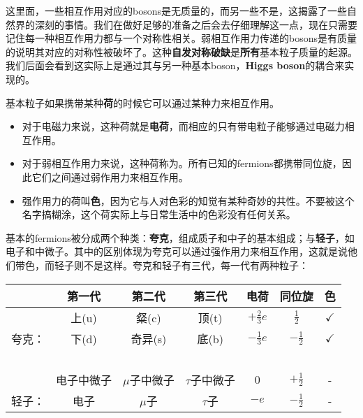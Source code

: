这里面，一些相互作用对应的bosons是无质量的，而另一些不是，这揭露了一些自然界的深刻的事情。我们在做好足够的准备之后会去仔细理解这一点，现在只需要记住每一种相互作用力都与一个对称性相关。弱相互作用力传递的bosons是有质量的说明其对应的对称性被破坏了。这种{\bf 自发对称破缺}是{\bf 所有}基本粒子质量的起源。我们后面会看到这实际上是通过其与另一种基本boson，{\bf Higgs boson}的耦合来实现的。

基本粒子如果携带某种{\bf 荷}的时候它可以通过某种力来相互作用。

\begin{itemize}
\item 对于电磁力来说，这种荷就是{\bf 电荷}，而相应的只有带电粒子能够通过电磁力相互作用。
\item 对于弱相互作用力来说，这种荷称为。所有已知的fermions都携带同位旋，因此它们之间通过弱作用力来相互作用。
\item 强作用力的荷叫{\bf 色}，因为它与人对色彩的知觉有某种奇妙的共性。不要被这个名字搞糊涂，这个荷实际上与日常生活中的色彩没有任何关系。
\end{itemize}

基本的fermions被分成两个种类：{\bf 夸克}，组成质子和中子的基本组成；与{\bf 轻子}，如电子和中微子。其中的区别体现为夸克可以通过强作用力来相互作用，这就是说他们带色，而轻子则不是这样。夸克和轻子有三代，每一代有两种粒子：

\begin{table}[h]
\centering
\begin{tabular}{c|c|c|c|c|c|c}
 \hline
 & 第一代 & 第二代 & 第三代 & 电荷 & 同位旋 & 色 \\
 \hline
 & 上(u)  & 粲(c) &  顶(t) & $+\tfrac{2}{3}e$  & $\tfrac{1}{2}$ & $\checkmark$\\
 夸克： & 下(d) & 奇异(s) &底(b) & $-\tfrac{1}{3}e$ & $-\tfrac{1}{2}$ & $\checkmark$\\
 \hline
 \ &\ &\ &\ &\ &\ &\ \\
 \hline
 & 电子中微子 & $\mu$子中微子 & $\tau$子中微子 & 0 & $+\tfrac{1}{2}$ & -\\
 轻子：&电子 & $\mu$子 & $\tau$子 & $-e$ & $-\tfrac{1}{2}$ & -\\
 \hline
\end{tabular}
\end{table}

